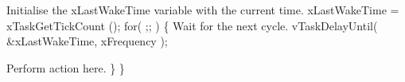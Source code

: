 \begin{DoxyPre}Initialise the xLastWakeTime variable with the current time.
     xLastWakeTime = xTaskGetTickCount ();
     for( ;; )
     \{
Wait for the next cycle.
         vTaskDelayUntil( &xLastWakeTime, xFrequency );\end{DoxyPre}



\begin{DoxyPre}Perform action here.
     \}
 \}
   \end{DoxyPre}
 